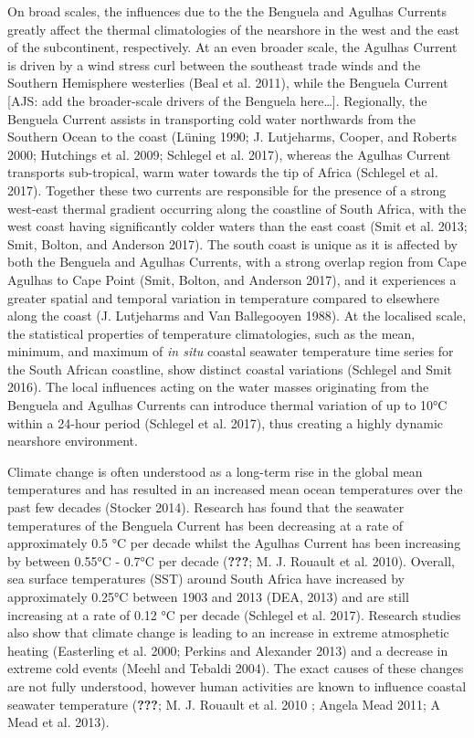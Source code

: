 \documentclass[12pt,A4paper,]{article}
\begin{document}
On broad scales, the influences due to the the Benguela and Agulhas
Currents greatly affect the thermal climatologies of the nearshore in
the west and the east of the subcontinent, respectively. At an even
broader scale, the Agulhas Current is driven by a wind stress curl
between the southeast trade winds and the Southern Hemisphere westerlies
(Beal et al. 2011), while the Benguela Current {[}AJS: add the
broader-scale drivers of the Benguela here\ldots{}{]}. Regionally, the
Benguela Current assists in transporting cold water northwards from the
Southern Ocean to the coast (Lüning 1990; J. Lutjeharms, Cooper, and
Roberts 2000; Hutchings et al. 2009; Schlegel et al. 2017), whereas the
Agulhas Current transports sub-tropical, warm water towards the tip of
Africa (Schlegel et al. 2017). Together these two currents are
responsible for the presence of a strong west-east thermal gradient
occurring along the coastline of South Africa, with the west coast
having significantly colder waters than the east coast (Smit et al.
2013; Smit, Bolton, and Anderson 2017). The south coast is unique as it
is affected by both the Benguela and Agulhas Currents, with a strong
overlap region from Cape Agulhas to Cape Point (Smit, Bolton, and
Anderson 2017), and it experiences a greater spatial and temporal
variation in temperature compared to elsewhere along the coast (J.
Lutjeharms and Van Ballegooyen 1988). At the localised scale, the
statistical properties of temperature climatologies, such as the mean,
minimum, and maximum of \emph{in situ} coastal seawater temperature time
series for the South African coastline, show distinct coastal variations
(Schlegel and Smit 2016). The local influences acting on the water
masses originating from the Benguela and Agulhas Currents can introduce
thermal variation of up to 10°C within a 24-hour period (Schlegel et al.
2017), thus creating a highly dynamic nearshore environment.

Climate change is often understood as a long-term rise in the global
mean temperatures and has resulted in an increased mean ocean
temperatures over the past few decades (Stocker 2014). Research has
found that the seawater temperatures of the Benguela Current has been
decreasing at a rate of approximately 0.5 °C per decade whilst the
Agulhas Current has been increasing by between 0.55°C - 0.7°C per decade
({\textbf{???}}; M. J. Rouault et al. 2010). Overall, sea surface
temperatures (SST) around South Africa have increased by approximately
0.25°C between 1903 and 2013 (DEA, 2013) and are still increasing at a
rate of 0.12 °C per decade (Schlegel et al. 2017). Research studies also
show that climate change is leading to an increase in extreme
atmosphetic heating (Easterling et al. 2000; Perkins and Alexander 2013)
and a decrease in extreme cold events (Meehl and Tebaldi 2004). The
exact causes of these changes are not fully understood, however human
activities are known to influence coastal seawater temperature
({\textbf{???}}; M. J. Rouault et al. 2010 ; Angela Mead 2011; A Mead et
al. 2013).
\end{document}
